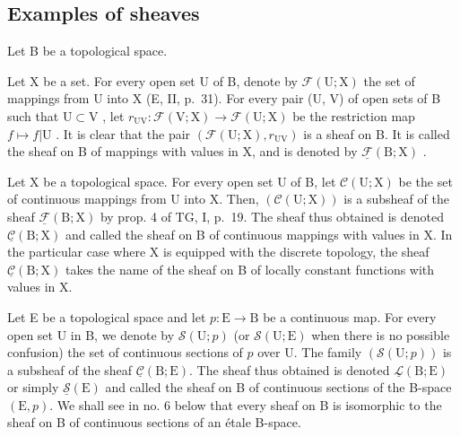 \subsection{Examples of sheaves}

Let B be a topological space.


Let X be a set. For every open set U of B, denote by \(\mathcal{F}(\mathrm{U};\mathrm{X})\) the set of mappings from U into X (E, II, p.~31). For every pair (U, V) of open sets of B such that \(\mathrm{U}\subset \mathrm{V}\) , let \(r_{\mathrm{UV}}\colon \mathcal{F}(\mathrm{V};\mathrm{X})\to\mathcal{F}(\mathrm{U};\mathrm{X})\) be the restriction map \(f\mapsto f|\mathrm{U}\) . It is clear that the pair \((\mathcal{F}(\mathrm{U};\mathrm{X}),r_{\mathrm{UV}})\) is a sheaf on B. It is called the sheaf on B of mappings with values in X, and is denoted by \(\underline{\mathcal{F}} (\mathrm{B};\mathrm{X})\) .


Let X be a topological space. For every open set U of B, let \(\mathcal{C}(\mathrm{U};\mathrm{X})\) be the set of continuous mappings from U into X. Then, \((\mathcal{C}(\mathrm{U};\mathrm{X}))\) is a subsheaf of the sheaf \(\underline{\mathcal{F}} (\mathrm{B};\mathrm{X})\) by prop. 4 of TG, I, p.~19. The sheaf thus obtained is denoted \(\underline{\mathcal{C}} (\mathrm{B};\mathrm{X})\) and called the sheaf on B of continuous mappings with values in X. In the particular case where X is equipped with the discrete topology, the sheaf \(\underline{\mathcal{C}} (\mathrm{B};\mathrm{X})\) takes the name of the sheaf on B of locally constant functions with values in X.


Let E be a topological space and let \(p \colon \mathrm{E} \to \mathrm{B}\) be a continuous map. For every open set U in B, we denote by \(\mathcal{S}(\mathrm{U};p)\) (or \(\mathcal{S}(\mathrm{U};\mathrm{E})\) when there is no possible confusion) the set of continuous sections of \(p\) over U. The family \((\mathcal{S}(\mathrm{U};p))\) is a subsheaf of the sheaf \(\underline{\mathcal{C}}(\mathrm{B};\mathrm{E})\). The sheaf thus obtained is denoted \(\underline{\mathcal{L}}(\mathrm{B};\mathrm{E})\) or simply \(\underline{\mathcal{S}}(\mathrm{E})\) and called the sheaf on B of continuous sections of the B-space \((\mathrm{E},p)\). We shall see in no. 6 below that every sheaf on B is isomorphic to the sheaf on B of continuous sections of an étale B-space.

